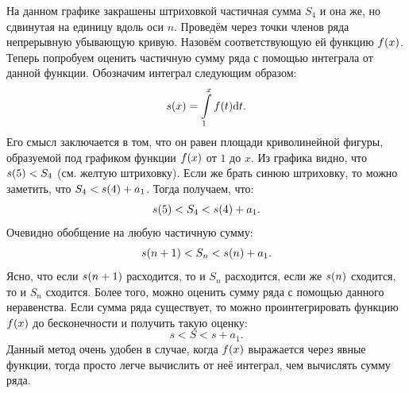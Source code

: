 \documentclass[12pt]{article}
\begin{document}
На данном графике закрашены штриховкой частичная сумма $S_4$ и она же, но сдвинутая на единицу вдоль оси $n$. Проведём через точки членов ряда непрерывную убывающую кривую. Назовём соответствующую ей функцию $f\qty(x)$. Теперь попробуем оценить частичную сумму ряда с помощью интеграла от данной функции. Обозначим интеграл следующим образом:
\begin{equation}
    s\qty(x) = \int\limits_1^x f\qty(t) \dd t.
\end{equation}
Его смысл заключается в том, что он равен площади криволинейной фигуры, образуемой под графиком функции $f\qty(x)$ от $1$ до $x$. Из графика видно, что $s\qty(5) < S_4$ (см. желтую штриховку). Если же брать синюю штриховку, то можно заметить, что $S_4 < s\qty(4) + a_1$. Тогда получаем, что:
\begin{equation}
    s\qty(5) < S_4 <  s\qty(4) + a_1.
\end{equation}
Очевидно обобщение на любую частичную сумму:
\begin{equation}
    s\qty(n+1) < S_n < s\qty(n) + a_1.
\end{equation}
Ясно, что если $s\qty(n+1)$ расходится, то и $S_n$ расходится, если же $s\qty(n)$ сходится, то и $S_n$ сходится. Более того, можно оценить сумму ряда с помощью данного неравенства. Если сумма ряда существует, то можно проинтегрировать функцию $f\qty(x)$ до бесконечности и получить такую оценку:
\begin{equation}
    s < S < s + a_1.
\end{equation}
Данный метод очень удобен в случае, когда $f\qty(x)$ выражается через явные функции, тогда просто легче вычислить от неё интеграл, чем вычислять сумму ряда.
\end{document}
